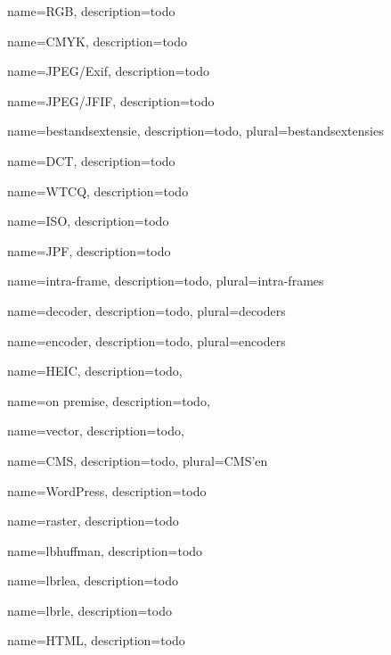 {
	name={RGB},
	description={todo}
}

{
	name={CMYK},
	description={todo}
}

{
	name={JPEG/Exif},
	description={todo}
}

{
	name={JPEG/JFIF},
	description={todo}
}

{
	name={bestandsextensie},
	description={todo},
	plural={bestandsextensies}
}

{
	name={DCT},
	description={todo}
}

{
	name={WTCQ},
	description={todo}
}

{
	name={ISO},
	description={todo}
}

{
	name={JPF},
	description={todo}
}

{
	name={intra-frame},
	description={todo},
	plural={intra-frames}
}

{
	name={decoder},
	description={todo},
	plural={decoders}
}

{
	name={encoder},
	description={todo},
	plural={encoders}
}

{
	name={HEIC},
	description={todo},
}

{
	name={on premise},
	description={todo},
}

{
	name={vector},
	description={todo},
}

{
	name={CMS},
	description={todo},
	plural={CMS'en}
}

{
	name={WordPress},
	description={todo}
}

{
	name={raster},
	description={todo}
}

{
	name={lbhuffman},
	description={todo}
}

{
	name={lbrlea},
	description={todo}
}

{
	name={lbrle},
	description={todo}
}

{
	name={HTML},
	description={todo}
}


